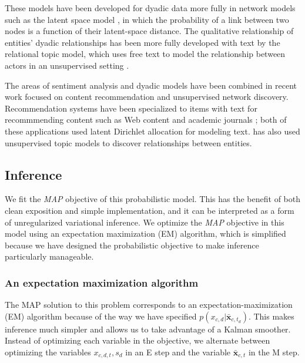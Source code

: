 These models have been developed for dyadic data more fully in network
models such as the latent space model \citep{hoff:2002,sarkar:2005}, in
which the probability of a link between two nodes is a function of
their latent-space distance.  The qualitative relationship of
entities' dyadic relationships has been more fully developed with text
by the relational topic model, which uses free text to model the
relationship between actors in an unsupervised setting
\citep{chang:2009}.

The areas of sentiment analysis and dyadic models have been combined
in recent work focused on content recommendation and unsupervised
network discovery.  Recommendation systems have been specialized to
items with text for recommmending content such as Web content
\citep{agarwal:2010} and academic journals \citep{wang:2011}; both of
these applications used latent Dirichlet allocation for modeling text.
\cite{chang:2009} has also used unsupervised topic models to discover
relationships between entities.



\subsection{Inference}
\label{sec:fr_inference}
We fit the \emph{MAP} objective of this probabilistic model.  This has
the benefit of both clean exposition and simple implementation, and it
can be interpreted as a form of unregularized variational inference.
We optimize the \emph{MAP} objective in this model using an
expectation maximization (EM) algorithm, which is simplified because
we have designed the probabilistic objective to make inference
particularly manageable.

\subsubsection{An expectation maximization algorithm}
The MAP solution to this problem corresponds to an
expectation-maximization (EM) algorithm because of the way we have
specified $p(x_{c,d} | \bm \bar x_{c, t_d})$.  This makes inference
much simpler and allows us to take advantage of a Kalman smoother.
Instead of optimizing each variable in the objective, we alternate
between optimizing the variables $x_{c,d,t}, s_d$ in an E step and the
variable $\bm \bar x_{c,t}$ in the M step.

